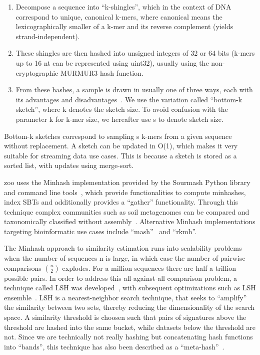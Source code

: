 \begin{enumerate}
    \item Decompose a sequence into ``k-shingles'', which in the context of DNA correspond to unique, canonical k-mers, where canonical means the lexicographically smaller of a k-mer and its reverse complement (yields strand-independent).
    \item These shingles are then hashed into unsigned integers of 32 or 64 bits (k-mers up to 16 nt can be represented using uint32), usually using the non-cryptographic MURMUR3 hash function.
    \item From these hashes, a sample is drawn in usually one of three ways, each with its advantages and disadvantages~\cite{Wang2014-ry, Cohen2016-sa}. We use the variation called ``bottom-k sketch'', where k denotes the sketch size. To avoid confusion with the parameter k for k-mer size, we hereafter use s to denote sketch size.
\end{enumerate}

Bottom-k sketches correspond to sampling s k-mers from a given sequence without replacement. A sketch can be updated in O(1), which makes it very suitable for streaming data use cases. This is because a sketch is stored as a sorted list, with updates using merge-sort.

zoo uses the Minhash implementation provided by the Sourmash Python library and command line tools~\cite{Brown2016-gd}, which provide functionalities to compute minhashes, index SBTs and additionally provides a ``gather'' functionality. Through this technique complex communities such as soil metagenomes can be compared and taxonomically classified without assembly~\cite{Brown2016-fu}. Alternative Minhash implementations targeting bioinformatic use cases include ``mash''~\cite{Ondov2016-sl} and ``rkmh''.

The Minhash approach to similarity estimation runs into scalability problems when the number of sequences n is large, in which case the number of pairwise comparisons $n \choose 2$ explodes. For a million sequences there are half a trillion possible pairs. In order to address this all-against-all comparison problem, a technique called LSH was developed~\cite{Gionis1999-dz}, with subsequent optimizations such as LSH ensemble~\cite{Zhu2016-tu}. LSH is a nearest-neighbor search technique, that seeks to ``amplify'' the similarity between two sets, thereby reducing the dimensionality of the search space. A similarity threshold is choosen such that pairs of signatures above the threshold are hashed into the same bucket, while datasets below the threshold are not. Since we are technically not really hashing but concatenating hash functions into ``bands'', this technique has also been described as a ``meta-hash''~\cite{Shrivastava2015-oa}.

